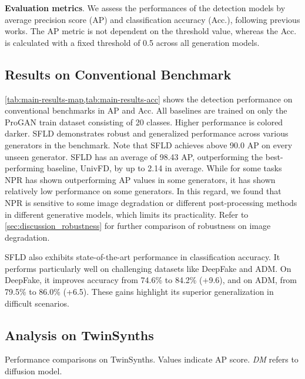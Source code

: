 \textbf{Evaluation metrics}. 
We assess the performances of the detection models by average precision score (AP) and classification accuracy (Acc.), following previous works\cite{wang2020cnn, ojha2023towards, tan2024rethinking}. The AP metric is not dependent on the threshold value, whereas the Acc. is calculated with a fixed threshold of 0.5 across all generation models. 


\subsection{Results on Conventional Benchmark}
\cref{tab:main-results-map,tab:main-results-acc} shows the detection performance on conventional benchmarks in AP and Acc.
All baselines are trained on only the ProGAN train dataset consisting of 20 classes.
Higher performance is colored darker.
SFLD demonstrates robust and generalized performance across various generators in the benchmark. 
Note that SFLD achieves above 90.0 AP on every unseen generator. 
SFLD has an average of 98.43 AP, outperforming the best-performing baseline, UnivFD, by up to 2.14 in average. 
While for some tasks NPR has shown outperforming AP values in some generators, it has shown relatively low performance on some generators.
In this regard, we found that NPR is sensitive to some image degradation or different post-processing methods in different generative models, which limits its practicality.
Refer to \cref{sec:discussion_robustness} for further comparison of robustness on image degradation.

SFLD also exhibits state-of-the-art performance in classification accuracy. It performs particularly well on challenging datasets like DeepFake and ADM. On DeepFake, it improves accuracy from 74.6\% to 84.2\% (+9.6), and on ADM, from 79.5\% to 86.0\% (+6.5). These gains highlight its superior generalization in difficult scenarios.


\subsection{Analysis on TwinSynths} 
\label{sec:experiments_bench_ours}

\begin{table}[t]
    \centering
    \resizebox{0.8\linewidth}{!}{
        
    }
    \caption{Performance comparisons on TwinSynths. Values indicate AP score. \emph{DM} refers to diffusion model.}
    \label{tab:bench_ours}
\end{table}


